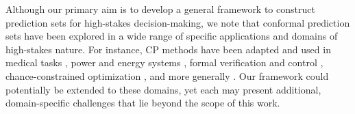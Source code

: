 Although our primary aim is to develop a general framework to construct prediction sets for  high-stakes decision-making, we note that conformal prediction sets have  been explored in a wide range of specific applications and domains of high-stakes nature. For instance, CP methods have been adapted and used in medical tasks \cite{banerji2023clinical}, power and energy systems \cite{renkema2024conformal}, formal verification and control \cite{lindemann2024formal},  chance-constrained optimization \cite{zhao2024conformal}, and more generally \citet{sun2024conformal, ramalingam2024uncertainty,kiyani2024conformal,straitouri2023improving, vishwakarma2024improving, kiyani2024length, vanderlaan2024selfcalibratingconformalprediction, noorani2024conformalriskminimizationvariance}. Our framework could potentially be extended to these domains, yet each may present additional, domain-specific challenges that lie beyond the scope of this work.







